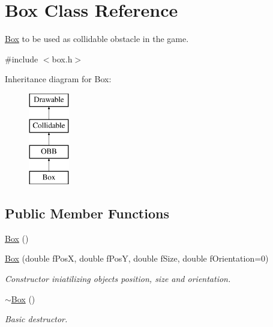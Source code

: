 \hypertarget{class_box}{}\section{Box Class Reference}
\label{class_box}


\hyperlink{class_box}{Box} to be used as collidable obstacle in the game.  




{\ttfamily \#include $<$box.\+h$>$}

Inheritance diagram for Box\+:\begin{figure}[H]
\begin{center}
\leavevmode
\includegraphics[height=4.000000cm]{class_box}
\end{center}
\end{figure}
\subsection*{Public Member Functions}
\begin{DoxyCompactItemize}
\item 
\hyperlink{class_box_aca78d7db44972bfa78d46b7bbc8796f6}{Box} ()
\item 
\hyperlink{class_box_abbd9e77b3e9400ef44c6d52e0682b9d9}{Box} (double f\+Pos\+X, double f\+Pos\+Y, double f\+Size, double f\+Orientation=0)
\begin{DoxyCompactList}\small\item\em Constructor iniatilizing object\textquotesingle{}s position, size and orientation. \end{DoxyCompactList}\item 
\hypertarget{class_box_a6a5e09398e85d602a046b429062fb9c2}{}\hyperlink{class_box_a6a5e09398e85d602a046b429062fb9c2}{$\sim$\+Box} ()\label{class_box_a6a5e09398e85d602a046b429062fb9c2}

\begin{DoxyCompactList}\small\item\em Basic destructor. \end{DoxyCompactList}\end{DoxyCompactItemize}
